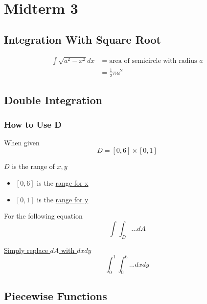 \section{Midterm 3}

  \subsection{Integration With Square Root}

    \begin{align*}
      \int \sqrt{a^{2} - x^{2}} dx &= \text{area of semicircle with radius } a \\
      &= \frac{1}{2} \pi a^{2}
    \end{align*}

  \subsection{Double Integration}

    \subsubsection{How to Use D}

      When given
      \begin{displaymath}
        D = \left[ 0, 6 \right] \times \left[ 0, 1 \right]
      \end{displaymath}

      $ D $ is the range of $ x, y $

      \begin{itemize}
        \item $ \left[ 0, 6 \right] $ is the \ul{range for x}
        \item $ \left[ 0, 1 \right] $ is the \ul{range for y}
      \end{itemize}

      For the following equation
      \begin{displaymath}
        \int \int_{D} ... dA
      \end{displaymath}

      \ul{Simply replace $ dA $ with $ dx dy $}
      \begin{displaymath}
        \int_{0}^{1} \int_{0}^{6} ... dx dy
      \end{displaymath}

  \subsection{Piecewise Functions}

